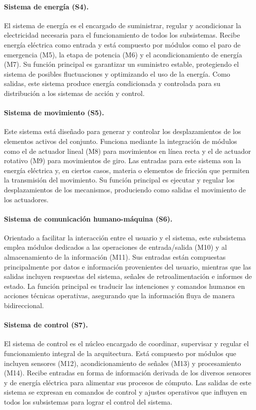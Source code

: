 \paragraph*{Sistema de energía (S4).}
El sistema de energía es el encargado de suministrar, regular y acondicionar la electricidad necesaria para el funcionamiento de todos los subsistemas. Recibe energía eléctrica como entrada y está compuesto por módulos como el paro de emergencia (M5), la etapa de potencia (M6) y el acondicionamiento de energía (M7). Su función principal es garantizar un suministro estable, protegiendo el sistema de posibles fluctuaciones y optimizando el uso de la energía. Como salidas, este sistema produce energía condicionada y controlada para su distribución a los sistemas de acción y control.

\paragraph*{Sistema de movimiento (S5).}  
Este sistema está diseñado para generar y controlar los desplazamientos de los elementos activos del conjunto. Funciona mediante la integración de módulos como el de actuador lineal (M8) para movimientos en línea recta y el de actuador rotativo (M9) para movimientos de giro. Las entradas para este sistema son la energía eléctrica y, en ciertos casos, materia o elementos de fricción que permiten la transmisión del movimiento. Su función principal es ejecutar y regular los desplazamientos de los mecanismos, produciendo como salidas el movimiento de los actuadores.

\paragraph*{Sistema de comunicación humano-máquina (S6).}
Orientado a facilitar la interacción entre el usuario y el sistema, este subsistema emplea módulos dedicados a las operaciones de entrada/salida (M10) y al almacenamiento de la información (M11). Sus entradas están compuestas principalmente por datos e información provenientes del usuario, mientras que las salidas incluyen respuestas del sistema, señales de retroalimentación e informes de estado. La función principal es traducir las intenciones y comandos humanos en acciones técnicas operativas, asegurando que la información fluya de manera bidireccional.

\paragraph*{Sistema de control (S7).}  
El sistema de control es el núcleo encargado de coordinar, supervisar y regular el funcionamiento integral de la arquitectura. Está compuesto por módulos que incluyen sensores (M12), acondicionamiento de señales (M13) y procesamiento (M14). Recibe entradas en forma de información derivada de los diversos sensores y de energía eléctrica para alimentar sus procesos de cómputo. Las salidas de este sistema se expresan en comandos de control y ajustes operativos que influyen en todos los subsistemas para lograr el control del sistema.

